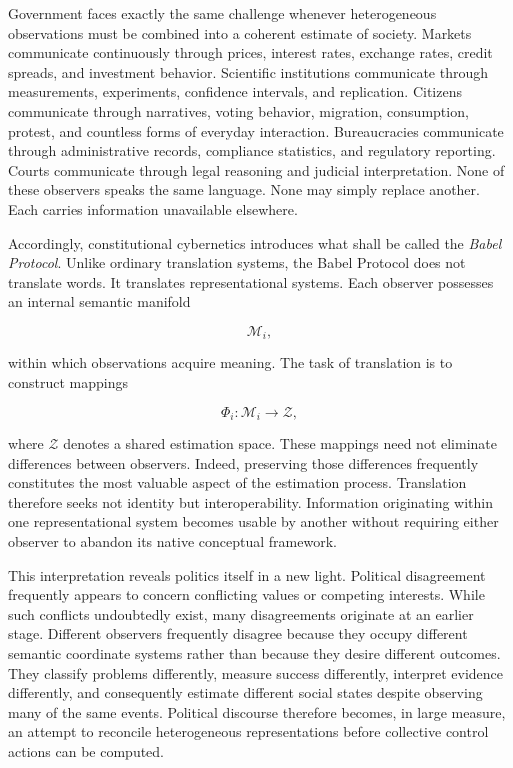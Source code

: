 \documentclass[12pt,a4paper]{article}
\begin{document}
Government faces exactly the same challenge whenever heterogeneous observations must be combined into a coherent estimate of society. Markets communicate continuously through prices, interest rates, exchange rates, credit spreads, and investment behavior. Scientific institutions communicate through measurements, experiments, confidence intervals, and replication. Citizens communicate through narratives, voting behavior, migration, consumption, protest, and countless forms of everyday interaction. Bureaucracies communicate through administrative records, compliance statistics, and regulatory reporting. Courts communicate through legal reasoning and judicial interpretation. None of these observers speaks the same language. None may simply replace another. Each carries information unavailable elsewhere.

Accordingly, constitutional cybernetics introduces what shall be called the \emph{Babel Protocol}. Unlike ordinary translation systems, the Babel Protocol does not translate words. It translates representational systems. Each observer possesses an internal semantic manifold

\[
\mathcal{M}_i,
\]

within which observations acquire meaning. The task of translation is to construct mappings

\[
\Phi_i
:
\mathcal{M}_i
\rightarrow
\mathcal{Z},
\]

where \(\mathcal{Z}\) denotes a shared estimation space. These mappings need not eliminate differences between observers. Indeed, preserving those differences frequently constitutes the most valuable aspect of the estimation process. Translation therefore seeks not identity but interoperability. Information originating within one representational system becomes usable by another without requiring either observer to abandon its native conceptual framework.

This interpretation reveals politics itself in a new light. Political disagreement frequently appears to concern conflicting values or competing interests. While such conflicts undoubtedly exist, many disagreements originate at an earlier stage. Different observers frequently disagree because they occupy different semantic coordinate systems rather than because they desire different outcomes. They classify problems differently, measure success differently, interpret evidence differently, and consequently estimate different social states despite observing many of the same events. Political discourse therefore becomes, in large measure, an attempt to reconcile heterogeneous representations before collective control actions can be computed.
\end{document}
